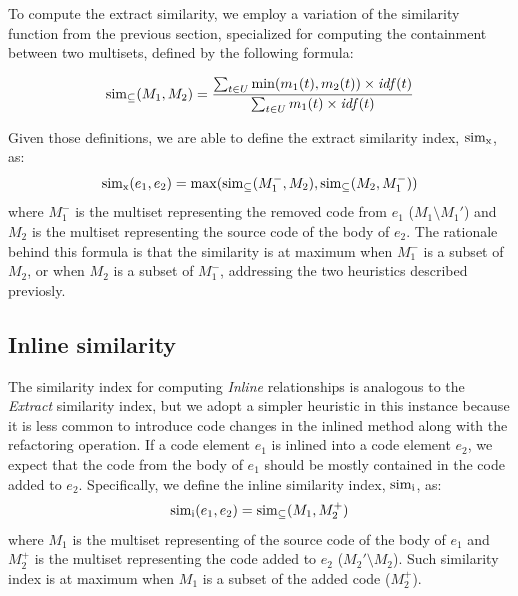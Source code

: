 To compute the extract similarity, we employ a variation of the similarity function from the previous section, specialized for computing the containment between two multisets, defined by the following formula:

\begin{align}
\operatorname{sim_{\subseteq}}(M_1, M_2) = \frac{\sum_{t \in U} \min(m_1(t), m_2(t)) \times \mathit{idf}(t)}
                        {\sum_{t \in U} m_1(t) \times \mathit{idf}(t)}
\end{align}

Given those definitions, we are able to define the extract similarity index, $\operatorname{sim_{x}}$, as:
\begin{align}
\operatorname{sim_{x}}(e_1, e_2) = \max( \operatorname{sim_{\subseteq}}(M_1^-, M_2), \operatorname{sim_{\subseteq}}(M_2, M_1^-) )
\end{align}
where $M_1^-$ is the multiset representing the removed code from $e_1$ ($M_1 \setminus M_1'$) and $M_2$ is the multiset representing the source code of the body of $e_2$. The rationale behind this formula is that the similarity is at maximum when $M_1^-$ is a subset of $M_2$, or when $M_2$ is a subset of $M_1^-$, addressing the two heuristics described previosly.

\subsection{Inline similarity}
\label{SecSimI}

The similarity index for computing \textit{Inline} relationships is analogous to the \textit{Extract} similarity index, but we adopt a simpler heuristic in this instance because it is less common to introduce code changes in the inlined method along with the refactoring operation.
If a code element $e_1$ is inlined into a code element $e_2$, we expect that the code from the body of $e_1$ should be mostly contained in the code added to $e_2$. Specifically, we define the inline similarity index, $\operatorname{sim_{i}}$, as:
\begin{align}
\operatorname{sim_{i}}(e_1, e_2) = \operatorname{sim_{\subseteq}}(M_1, M_2^+)
\end{align}
where $M_1$ is the multiset representing of the source code of the body of $e_1$ and $M_2^+$ is the multiset representing the code added to $e_2$ ($M_2' \setminus M_2$). Such similarity index is at maximum when $M_1$ is a subset of the added code ($M_2^+$).
